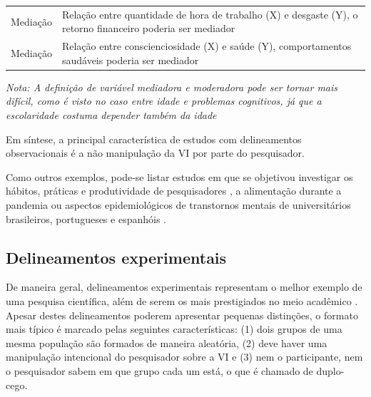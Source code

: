 \documentclass[
]{book}
\begin{document}
\begin{longtable}[]{@{}ll@{}}
\begin{minipage}[t]{0.10\columnwidth}\raggedright
Mediação\strut
\end{minipage} & \begin{minipage}[t]{0.84\columnwidth}\raggedright
Relação entre quantidade de hora de trabalho (X) e desgaste (Y), o retorno financeiro poderia ser mediador\strut
\end{minipage}\tabularnewline
\begin{minipage}[t]{0.10\columnwidth}\raggedright
Mediação\strut
\end{minipage} & \begin{minipage}[t]{0.84\columnwidth}\raggedright
Relação entre conscienciosidade (X) e saúde (Y), comportamentos saudáveis poderia ser mediador\strut
\end{minipage}\tabularnewline
\bottomrule
\end{longtable}

\emph{Nota: A definição de variável mediadora e moderadora pode ser tornar mais difícil, como é visto no caso entre idade e problemas cognitivos, já que a escolaridade costuma depender também da idade}

Em síntese, a principal característica de estudos com delineamentos observacionais é a não manipulação da VI por parte do pesquisador.

Como outros exemplos, pode-se listar estudos em que se objetivou investigar os hábitos, práticas e produtividade de pesquisadores \citep{Wenke2017}, a alimentação durante a pandemia \citep{Amatori2020} ou aspectos epidemiológicos de transtornos mentais de universitários brasileiros, portugueses e espanhóis \citep{AfonsoJunior2020}.

\hypertarget{delineamentos-experimentais}{%
\subsection{Delineamentos experimentais}\label{delineamentos-experimentais}}

De maneira geral, delineamentos experimentais representam o melhor exemplo de uma pesquisa científica, além de serem os mais prestigiados no meio acadêmico \citep{gil2002}. Apesar destes delineamentos poderem apresentar pequenas distinções, o formato mais típico é marcado pelas seguintes características: (1) dois grupos de uma mesma população são formados de maneira aleatória, (2) deve haver uma manipulação intencional do pesquisador sobre a VI e (3) nem o participante, nem o pesquisador sabem em que grupo cada um está, o que é chamado de duplo-cego.
\end{document}
